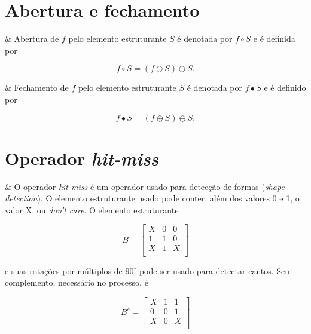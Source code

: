 \section{Abertura e fechamento}

\begin{easylist}

  & Abertura de $f$ pelo elemento estruturante $S$ é denotada por $f \circ S$ e é definida por

  \[ f \circ S = (f \ominus S) \oplus S. \]

  & Fechamento de $f$ pelo elemento estruturante $S$ é denotada por $f \bullet S$ e é definido por

  \[ f \bullet S = (f \oplus S) \ominus S. \]

\end{easylist}


\section{Operador \textit{hit-miss}}

\begin{easylist}

  & O operador \textit{hit-miss} é um operador usado para detecção de formas (\textit{shape detection}). O elemento estruturante usado pode conter, além dos valores 0 e 1, o valor X, ou \textit{don't care}. O elemento estruturante

  \end{easylist}

  \[
    B = 
    \begin{bmatrix}
      X & 0 & 0 \\
      1 & 1 & 0 \\
      X & 1 & X \\
    \end{bmatrix}  
  \]
    
\begin{easylist}

  e suas rotações por múltiplos de $90^\circ$ pode ser usado para detectar cantos. Seu complemento, necessário no processo, é

\end{easylist}
  
  \[
    B^c = 
    \begin{bmatrix}
      X & 1 & 1 \\
      0 & 0 & 1 \\
      X & 0 & X \\
    \end{bmatrix}  
  \]

